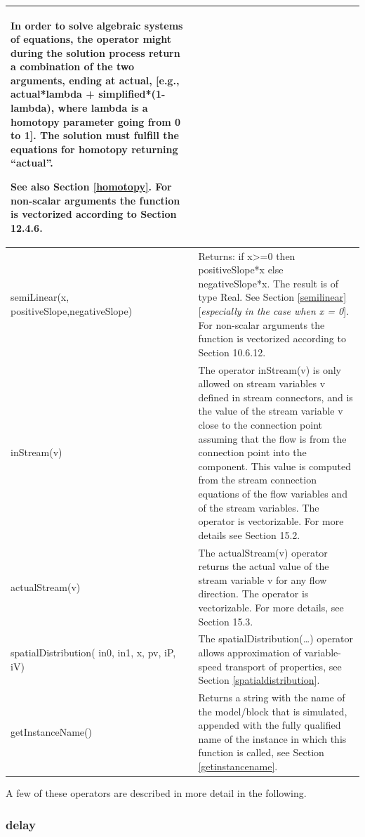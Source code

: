 \documentclass[10pt,a4paper]{report}
\def\Mcomment#1{{[}\emph{#1}{]}}
\def\doublelabel#1{\label{#1}\hypertarget{#1}{}}
\begin{document}
\begin{longtable}{|p{3cm}|p{8cm}|}
  In order to solve algebraic systems of equations,
  the operator might during the solution process return a combination of
  the two arguments, ending at actual, {[}e.g.,
   actual*lambda + simplified*(1-lambda),
  where lambda is a homotopy parameter going from 0 to
  1{]}. The solution must fulfill the equations for
  homotopy returning ``actual''.
  
See also Section \ref{homotopy}. For non-scalar arguments the function is
vectorized according to Section 12.4.6.\\ \hline
semiLinear(x, positiveSlope,\linebreak[4] negativeSlope) & Returns:
if x\textgreater{}=0 then positiveSlope*x else negativeSlope*x.
The result is of type Real. See Section \ref{semilinear} \Mcomment{especially in
the case when x = 0}. For non-scalar arguments the function is
vectorized according to Section 10.6.12.\\ \hline
inStream(v) & The operator inStream(v) is only allowed on stream
variables v defined in stream connectors, and is the value of the stream
variable v close to the connection point assuming that the flow is from
the connection point into the component. This value is computed from the
stream connection equations of the flow variables and of the stream
variables. The operator is vectorizable. For more details see Section 15.2.\\ \hline
actualStream(v) & The actualStream(v) operator returns the actual value
of the stream variable v for any flow direction. The operator is
vectorizable. For more details, see Section 15.3.\\ \hline
spatialDistribution( in0, in1, x, pv,
iP, iV) & The spatialDistribution(\ldots{}) operator allows
approximation of variable-speed transport of properties, see Section \ref{spatialdistribution}.\\ \hline
getInstanceName() & Returns a string with the name of the model/block
that is simulated, appended with the fully qualified name of the
instance in which this function is called, see Section \ref{getinstancename}.\\ \hline
\end{longtable}

A few of these operators are described in more detail in the following.

\subsubsection{delay}\doublelabel{delay}
\end{document}
